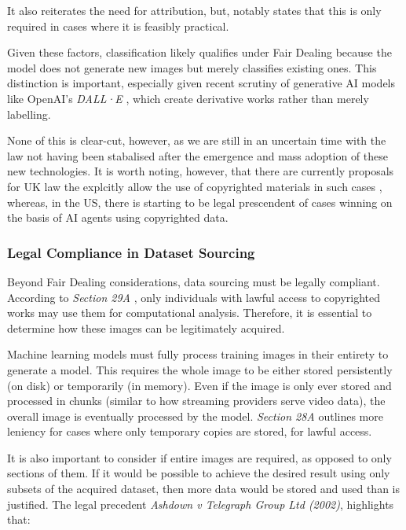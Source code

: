                   It also reiterates the need for attribution, but, notably states that this is only required in cases where it is feasibly practical.
    
                  Given these factors, classification likely qualifies under Fair Dealing because the model does not generate new images but merely classifies existing ones. This distinction is important, especially given recent scrutiny of generative AI models like OpenAI’s \textit{DALL·E} \cite{times2025christies_ai_auction, guardian2025ai_art_auction}, which create derivative works rather than merely labelling.
    
                  None of this is clear-cut, however, as we are still in an uncertain time with the law not having been stabalised after the emergence and mass adoption \cite{bick2024rapid} of these new technologies. It is worth noting, however, that there are currently proposals for UK law the explcitly allow the use of copyrighted materials in such cases \cite{guardian2024uk_ai_copyright}, whereas, in the US, there is starting to be legal prescendent of cases winning on the basis \cite{apnews2025thomson_reuters_ai_case} of AI agents using copyrighted data.
    
              \subsubsection{Legal Compliance in Dataset Sourcing}
    
                  Beyond Fair Dealing considerations, data sourcing must be legally compliant. According to \textit{Section 29A} \cite{cdpa1988}, only individuals with lawful access to copyrighted works may use them for computational analysis. Therefore, it is essential to determine how these images can be legitimately acquired.
    
                  Machine learning models must fully process training images in their entirety to generate a model. This requires the whole image to be either stored persistently (on disk) or temporarily (in memory). Even if the image is only ever stored and processed in chunks (similar to how streaming providers serve video data), the overall image is eventually processed by the model. \textit{Section 28A} outlines more leniency for cases where only temporary copies are stored, for lawful access.
    
                  It is also important to consider if entire images are required, as opposed to only sections of them. If it would be possible to achieve the desired result using only subsets of the acquired dataset, then more data would be stored and used than is justified. The legal precedent \textit{Ashdown v Telegraph Group Ltd (2002)}, highlights that:
    

